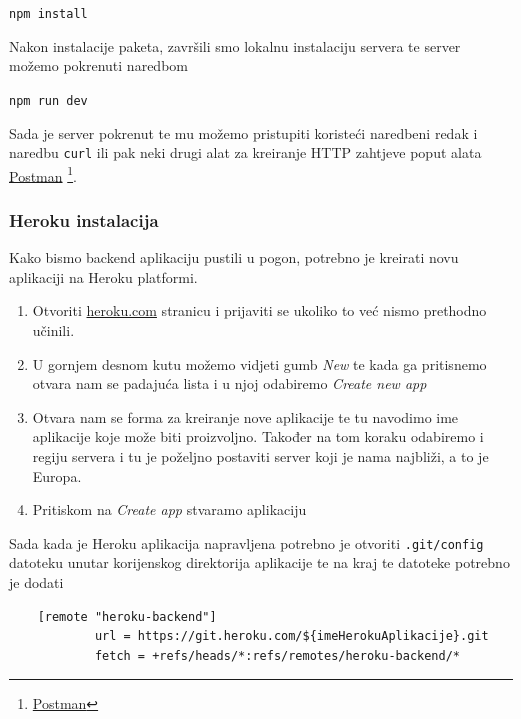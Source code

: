 								\begin{center}
										\texttt{npm install}
								\end{center}
								
								Nakon instalacije paketa, završili smo lokalnu instalaciju servera te server možemo pokrenuti naredbom
								
								\begin{center}
										\texttt{npm run dev}
								\end{center}
								
								Sada je server pokrenut te mu možemo pristupiti koristeći naredbeni redak i naredbu \texttt{curl} ili pak neki drugi alat za kreiranje HTTP zahtjeve poput alata \underline{Postman} \footnote{\href{https://www.postman.com/}{Postman}}.
		             
						\pagebreak
		    
						\subsubsection*{Heroku instalacija}
	        
								Kako bismo backend aplikaciju pustili u pogon, potrebno je kreirati novu aplikaciji na Heroku platformi.
								
								\begin{enumerate}
									\item Otvoriti \href{https://dashboard.heroku.com/apps}{heroku.com} stranicu i prijaviti se ukoliko to već nismo prethodno učinili.
									\item U gornjem desnom kutu možemo vidjeti gumb \textit{New} te kada ga pritisnemo otvara nam se padajuća lista i u njoj odabiremo \textit{Create new app}
									\item Otvara nam se forma za kreiranje nove aplikacije te tu navodimo ime aplikacije koje može biti proizvoljno. Također na tom koraku odabiremo i regiju servera i tu je poželjno postaviti server koji je nama najbliži, a to je Europa.
									\item Pritiskom na \textit{Create app} stvaramo aplikaciju
		        		\end{enumerate}
		        
		        		Sada kada je Heroku aplikacija napravljena potrebno je otvoriti \texttt{.git/config} datoteku unutar korijenskog direktorija aplikacije te na kraj te datoteke potrebno je dodati

                \begin{verbatim}
    [remote "heroku-backend"]
        	url = https://git.heroku.com/${imeHerokuAplikacije}.git
        	fetch = +refs/heads/*:refs/remotes/heroku-backend/*
								\end{verbatim}
								
